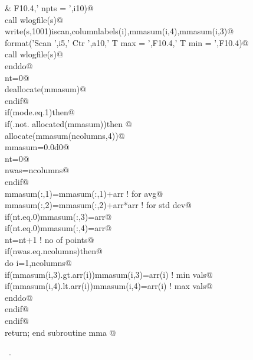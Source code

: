 \documentclass[10pt,a4paper,notitlepage]{article}
\begin{document}
\begin{flushleft}
\begin{minipage}{\linewidth}
\begin{list}{}{}
\mbox{}\verb@     &     F10.4,' npts = ',i10)@\\
\mbox{}\verb@        call wlogfile(s)@\\
\mbox{}\verb@        write(s,1001)iscan,columnlabels(i),mmasum(i,4),mmasum(i,3)@\\
\mbox{}    format('Scan ',i5,' Ctr ',a10,' T max = ',F10.4,' T min = ',F10.4)@\\
\mbox{}\verb@        call wlogfile(s)@\\
\mbox{}\verb@        enddo@\\
\mbox{}\verb@        nt=0@\\
\mbox{}\verb@        deallocate(mmasum)@\\
\mbox{}\verb@      endif@\\
\mbox{}\verb@      if(mode.eq.1)then@\\
\mbox{}\verb@        if(.not. allocated(mmasum))then @\\
\mbox{}\verb@          allocate(mmasum(ncolumns,4))@\\
\mbox{}\verb@          mmasum=0.0d0@\\
\mbox{}\verb@          nt=0@\\
\mbox{}\verb@          nwas=ncolumns@\\
\mbox{}\verb@        endif@\\
\mbox{}\verb@      mmasum(:,1)=mmasum(:,1)+arr                     ! for avg@\\
\mbox{}\verb@      mmasum(:,2)=mmasum(:,2)+arr*arr                 ! for std dev@\\
\mbox{}\verb@      if(nt.eq.0)mmasum(:,3)=arr@\\
\mbox{}\verb@      if(nt.eq.0)mmasum(:,4)=arr@\\
\mbox{}\verb@      nt=nt+1                             ! no of points@\\
\mbox{}\verb@      if(nwas.eq.ncolumns)then@\\
\mbox{}\verb@       do i=1,ncolumns@\\
\mbox{}\verb@        if(mmasum(i,3).gt.arr(i))mmasum(i,3)=arr(i)   ! min vals@\\
\mbox{}\verb@        if(mmasum(i,4).lt.arr(i))mmasum(i,4)=arr(i)   ! max vals@\\
\mbox{}\verb@       enddo@\\
\mbox{}\verb@      endif@\\
\mbox{}\verb@      endif@\\
\mbox{}\verb@      return; end subroutine mma                                           @{\NWsep}
\end{list}
\vspace{-1.5ex}
\footnotesize
\begin{list}{}{\setlength{\itemsep}{-\parsep}\setlength{\itemindent}{-\leftmargin}}
\item \NWtxtMacroRefIn\ .

\item{}
\end{list}
\end{minipage}\vspace{4ex}
\end{flushleft}
\end{document}
